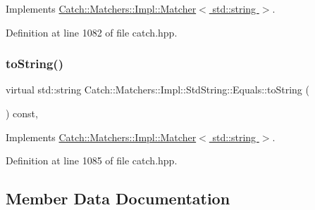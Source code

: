 Implements \hyperlink{struct_catch_1_1_matchers_1_1_impl_1_1_matcher_a8c1c5511ce1f3738a45e6901b558f583}{Catch\+::\+Matchers\+::\+Impl\+::\+Matcher$<$ std\+::string $>$}.



Definition at line 1082 of file catch.\+hpp.

\hypertarget{struct_catch_1_1_matchers_1_1_impl_1_1_std_string_1_1_equals_ab0d73961b95d9836d77b9e2e94c3790b}{}\label{struct_catch_1_1_matchers_1_1_impl_1_1_std_string_1_1_equals_ab0d73961b95d9836d77b9e2e94c3790b} 
\subsubsection{\texorpdfstring{to\+String()}{toString()}}
{\footnotesize\ttfamily virtual std\+::string Catch\+::\+Matchers\+::\+Impl\+::\+Std\+String\+::\+Equals\+::to\+String (\begin{DoxyParamCaption}{ }\end{DoxyParamCaption}) const\hspace{0.3cm}{\ttfamily [inline]}, {\ttfamily [virtual]}}



Implements \hyperlink{struct_catch_1_1_matchers_1_1_impl_1_1_matcher_a091bcc37e589967d7e10fc7790d820e2}{Catch\+::\+Matchers\+::\+Impl\+::\+Matcher$<$ std\+::string $>$}.



Definition at line 1085 of file catch.\+hpp.



\subsection{Member Data Documentation}
\hypertarget{struct_catch_1_1_matchers_1_1_impl_1_1_std_string_1_1_equals_ae09964b7ba291ce574b514a2ee3eddb0}{}\label{struct_catch_1_1_matchers_1_1_impl_1_1_std_string_1_1_equals_ae09964b7ba291ce574b514a2ee3eddb0} 

